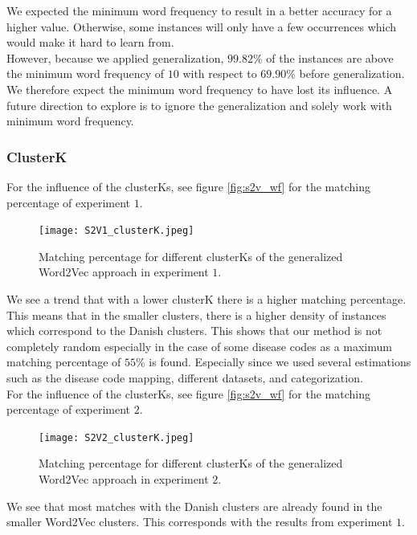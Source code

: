 We expected the minimum word frequency to result in a better accuracy for a higher value. Otherwise, some instances will only have a few occurrences which would make it hard to learn from. \\
However, because we applied generalization, $99.82$\% of the instances are above the minimum word frequency of $10$ with respect to $69.90$\% before generalization. We therefore expect the minimum word frequency to have lost its influence. A future direction to explore is to ignore the generalization and solely work with minimum word frequency.

\subsubsection{ClusterK}

For the influence of the clusterKs, see figure \ref{fig:s2v_wf} for the matching percentage of experiment $1$. \\

\begin{figure}[!htb]
	\centering
	\texttt{[image: S2V1\_clusterK.jpeg]}
	\caption{Matching percentage for different clusterKs of the generalized Word2Vec approach in experiment $1$.}
	\label{fig:s2v_clusterK_1}
\end{figure}

\noindent We see a trend that with a lower clusterK there is a higher matching percentage. This means that in the smaller clusters, there is a higher density of instances which correspond to the Danish clusters. This shows that our method is not completely random especially in the case of some disease codes as a maximum matching percentage of $55$\% is found. Especially since we used several estimations such as the disease code mapping, different datasets, and categorization. \\

\noindent For the influence of the clusterKs, see figure \ref{fig:s2v_wf} for the matching percentage of experiment $2$.\\

\begin{figure}[!htb]
	\centering
	\texttt{[image: S2V2\_clusterK.jpeg]}
	\caption{Matching percentage for different clusterKs of the generalized Word2Vec approach in experiment $2$.}
	\label{fig:s2v_clusterK_2}
\end{figure}

\noindent We see that most matches with the Danish clusters are already found in the smaller Word2Vec clusters. This corresponds with the results from experiment $1$.

